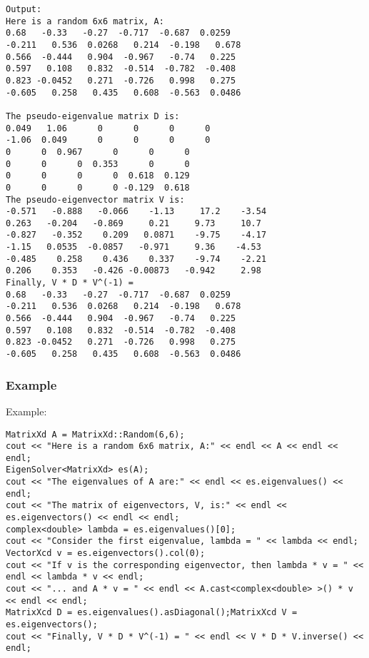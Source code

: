 \begin{verbatim}
Output:
Here is a random 6x6 matrix, A:
0.68   -0.33   -0.27  -0.717  -0.687  0.0259
-0.211   0.536  0.0268   0.214  -0.198   0.678
0.566  -0.444   0.904  -0.967   -0.74   0.225
0.597   0.108   0.832  -0.514  -0.782  -0.408
0.823 -0.0452   0.271  -0.726   0.998   0.275
-0.605   0.258   0.435   0.608  -0.563  0.0486

The pseudo-eigenvalue matrix D is:
0.049   1.06      0      0      0      0
-1.06  0.049      0      0      0      0
0      0  0.967      0      0      0
0      0      0  0.353      0      0
0      0      0      0  0.618  0.129
0      0      0      0 -0.129  0.618
The pseudo-eigenvector matrix V is:
-0.571   -0.888   -0.066    -1.13     17.2    -3.54
0.263   -0.204   -0.869     0.21     9.73     10.7
-0.827   -0.352    0.209   0.0871    -9.75    -4.17
-1.15   0.0535  -0.0857   -0.971     9.36    -4.53
-0.485    0.258    0.436    0.337    -9.74    -2.21
0.206    0.353   -0.426 -0.00873   -0.942     2.98
Finally, V * D * V^(-1) = 
0.68   -0.33   -0.27  -0.717  -0.687  0.0259
-0.211   0.536  0.0268   0.214  -0.198   0.678
0.566  -0.444   0.904  -0.967   -0.74   0.225
0.597   0.108   0.832  -0.514  -0.782  -0.408
0.823 -0.0452   0.271  -0.726   0.998   0.275
-0.605   0.258   0.435   0.608  -0.563  0.0486
\end{verbatim}




\subsubsection{Example}


Example:
\begin{lstlisting}
MatrixXd A = MatrixXd::Random(6,6);
cout << "Here is a random 6x6 matrix, A:" << endl << A << endl << endl;
EigenSolver<MatrixXd> es(A);
cout << "The eigenvalues of A are:" << endl << es.eigenvalues() << endl;
cout << "The matrix of eigenvectors, V, is:" << endl << es.eigenvectors() << endl << endl;
complex<double> lambda = es.eigenvalues()[0];
cout << "Consider the first eigenvalue, lambda = " << lambda << endl;
VectorXcd v = es.eigenvectors().col(0);
cout << "If v is the corresponding eigenvector, then lambda * v = " << endl << lambda * v << endl;
cout << "... and A * v = " << endl << A.cast<complex<double> >() * v << endl << endl;
MatrixXcd D = es.eigenvalues().asDiagonal();MatrixXcd V = es.eigenvectors();
cout << "Finally, V * D * V^(-1) = " << endl << V * D * V.inverse() << endl;
\end{lstlisting}


